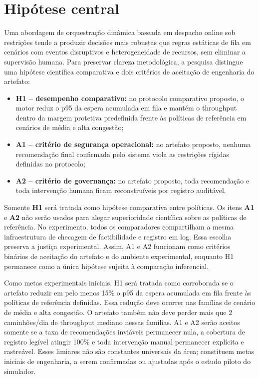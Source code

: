 \documentclass[
  12pt,
  oneside,
  a4paper,
  sumario=tradicional,
  brazil
]{abntex2}
\begin{document}
\chapter{Hipótese central}
Uma abordagem de orquestra\c{c}\~ao din\^amica baseada em despacho online sob restri\c{c}\~oes tende a produzir decis\~oes mais robustas que regras est\'aticas de fila em cen\'arios com eventos disruptivos e heterogeneidade de recursos, sem eliminar a supervis\~ao humana. Para preservar clareza metodol\'ogica, a pesquisa distingue uma hip\'otese cient\'ifica comparativa e dois crit\'erios de aceita\c{c}\~ao de engenharia do artefato:
\begin{itemize}[leftmargin=1.27cm,itemsep=0pt,topsep=0pt,parsep=0pt,partopsep=0pt]
  \item \textbf{H1 -- desempenho comparativo:} no protocolo comparativo proposto, o motor reduz o p95 da espera acumulada em fila e mant\'em o throughput dentro da margem protetiva predefinida frente \`as pol\'iticas de refer\^encia em cen\'arios de m\'edia e alta congest\~ao;
  \item \textbf{A1 -- crit\'erio de seguran\c{c}a operacional:} no artefato proposto, nenhuma recomenda\c{c}\~ao final confirmada pelo sistema viola as restri\c{c}\~oes r\'igidas definidas no protocolo;
  \item \textbf{A2 -- crit\'erio de governan\c{c}a:} no artefato proposto, toda recomenda\c{c}\~ao e toda interven\c{c}\~ao humana ficam reconstru\'iveis por registro audit\'avel.
\end{itemize}
Somente \textbf{H1} ser\'a tratada como hip\'otese comparativa entre pol\'iticas. Os itens \textbf{A1} e \textbf{A2} n\~ao ser\~ao usados para alegar superioridade cient\'ifica sobre as pol\'iticas de refer\^encia. No experimento, todos os comparadores compartilham a mesma infraestrutura de checagem de factibilidade e registro em log. Essa escolha preserva a justi\c{c}a experimental. Assim, A1 e A2 funcionam como crit\'erios bin\'arios de aceita\c{c}\~ao do artefato e do ambiente experimental, enquanto H1 permanece como a \'unica hip\'otese sujeita \`a compara\c{c}\~ao inferencial.

Como metas experimentais iniciais, H1 ser\'a tratada como corroborada se o artefato reduzir em pelo menos 15\% o p95 da espera acumulada em fila frente \`as pol\'iticas de refer\^encia definidas. Essa redu\c{c}\~ao deve ocorrer nas fam\'ilias de cen\'ario de m\'edia e alta congest\~ao. O artefato tamb\'em n\~ao deve perder mais que 2 caminh\~oes/dia de throughput mediano nessas fam\'ilias. A1 e A2 ser\~ao aceitos somente se a taxa de recomenda\c{c}\~oes invi\'aveis permanecer nula, a cobertura de registro leg\'ivel atingir 100\% e toda interven\c{c}\~ao manual permanecer expl\'icita e rastre\'avel. Esses limiares n\~ao s\~ao constantes universais da \'area; constituem metas iniciais de engenharia, a serem confirmadas ou ajustadas ap\'os o estudo piloto do simulador.
\end{document}
